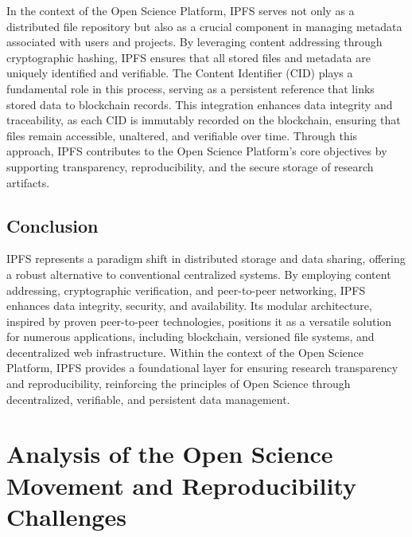 \documentclass{article}
\begin{document}
In the context of the Open Science Platform, IPFS serves not only as a distributed file repository but also as a crucial component in managing metadata associated with users and projects. By leveraging content addressing through cryptographic hashing, IPFS ensures that all stored files and metadata are uniquely identified and verifiable. The Content Identifier (CID) plays a fundamental role in this process, serving as a persistent reference that links stored data to blockchain records. This integration enhances data integrity and traceability, as each CID is immutably recorded on the blockchain, ensuring that files remain accessible, unaltered, and verifiable over time. Through this approach, IPFS contributes to the Open Science Platform’s core objectives by supporting transparency, reproducibility, and the secure storage of research artifacts.

\subsection{Conclusion}

IPFS represents a paradigm shift in distributed storage and data sharing, offering a robust alternative to conventional centralized systems. By employing content addressing, cryptographic verification, and peer-to-peer networking, IPFS enhances data integrity, security, and availability. Its modular architecture, inspired by proven peer-to-peer technologies, positions it as a versatile solution for numerous applications, including blockchain, versioned file systems, and decentralized web infrastructure. Within the context of the Open Science Platform, IPFS provides a foundational layer for ensuring research transparency and reproducibility, reinforcing the principles of Open Science through decentralized, verifiable, and persistent data management.



\section{Analysis of the Open Science Movement and Reproducibility Challenges}
\end{document}
